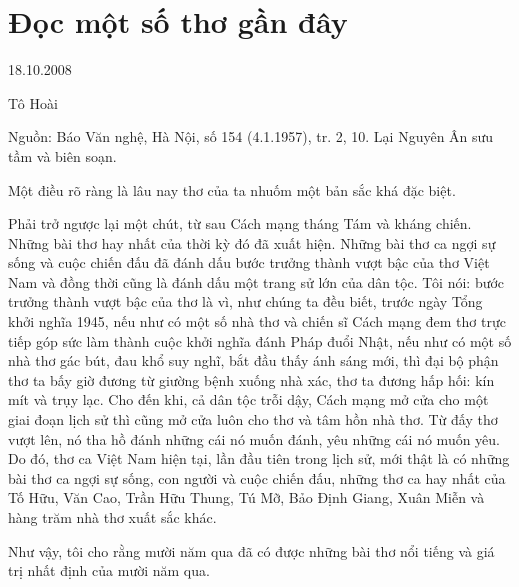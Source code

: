 \documentclass[../main.tex]{subfiles}
\begin{document}
\chapter{Đọc một số thơ gần đây}

\begin{metadata}

\begin{flushright}18.10.2008\end{flushright}

Tô Hoài

Nguồn: Báo Văn nghệ, Hà Nội, số 154 (4.1.1957), tr. 2, 10. Lại Nguyên Ân sưu tầm và biên soạn.

\end{metadata}

\begin{multicols}{2}

Một điều rõ ràng là lâu nay thơ của ta nhuốm một bản sắc khá đặc biệt. 
 
Phải trở ngược lại một chút, từ sau Cách mạng tháng Tám và kháng chiến. Những bài thơ hay nhất của thời kỳ đó đã xuất hiện. Những bài thơ ca ngợi sự sống và cuộc chiến đấu đã đánh dấu bước trưởng thành vượt bậc của thơ Việt Nam và đồng thời cũng là đánh dấu một trang sử lớn của dân tộc. Tôi nói: bước trưởng thành vượt bậc của thơ là vì, như chúng ta đều biết, trước ngày Tổng khởi nghĩa 1945, nếu như có một số nhà thơ và chiến sĩ Cách mạng đem thơ trực tiếp góp sức làm thành cuộc khởi nghĩa đánh Pháp đuổi Nhật, nếu như có một số nhà thơ gác bút, đau khổ suy nghĩ, bắt đầu thấy ánh sáng mới, thì đại bộ phận thơ ta bấy giờ đương từ giường bệnh xuống nhà xác, thơ ta đương hấp hối: kín mít và trụy lạc. Cho đến khi, cả dân tộc trỗi dậy, Cách mạng mở cửa cho một giai đoạn lịch sử thì cũng mở cửa luôn cho thơ và tâm hồn nhà thơ. Từ đấy thơ vượt lên, nó tha hồ đánh những cái nó muốn đánh, yêu những cái nó muốn yêu. Do đó, thơ ca Việt Nam hiện tại, lần đầu tiên trong lịch sử, mới thật là có những bài thơ ca ngợi sự sống, con người và cuộc chiến đấu, những thơ ca hay nhất của Tố Hữu, Văn Cao, Trần Hữu Thung, Tú Mỡ, Bảo Định Giang, Xuân Miễn và hàng trăm nhà thơ xuất sắc khác. 
 
Như vậy, tôi cho rằng mười năm qua đã có được những bài thơ nổi tiếng và giá trị nhất định của mười năm qua. 
 

\end{multicols}
\end{document}
